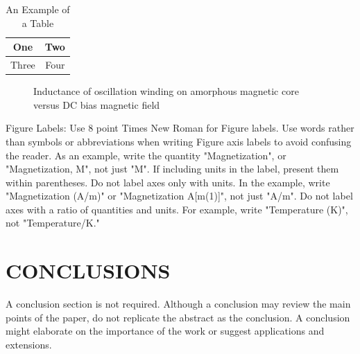 \documentclass[letterpaper, 10 pt, conference]{ieeeconf}  %
\begin{document}
\begin{table}[h]
\caption{An Example of a Table}
\label{table_example}
\begin{center}
\begin{tabular}{|c||c|}
\hline
One & Two\\
\hline
Three & Four\\
\hline
\end{tabular}
\end{center}
\end{table}


   \begin{figure}[thpb]
      \centering
      \caption{Inductance of oscillation winding on amorphous
       magnetic core versus DC bias magnetic field}
      \label{figurelabel}
   \end{figure}
   

Figure Labels: Use 8 point Times New Roman for Figure labels. Use words rather than symbols or abbreviations when writing Figure axis labels to avoid confusing the reader. As an example, write the quantity "Magnetization", or "Magnetization, M", not just "M". If including units in the label, present them within parentheses. Do not label axes only with units. In the example, write "Magnetization (A/m)" or "Magnetization {A[m(1)]}", not just "A/m". Do not label axes with a ratio of quantities and units. For example, write "Temperature (K)", not "Temperature/K."

\section{CONCLUSIONS}

A conclusion section is not required. Although a conclusion may review the main points of the paper, do not replicate the abstract as the conclusion. A conclusion might elaborate on the importance of the work or suggest applications and extensions. 

\addtolength{\textheight}{-12cm}   %
\end{document}
